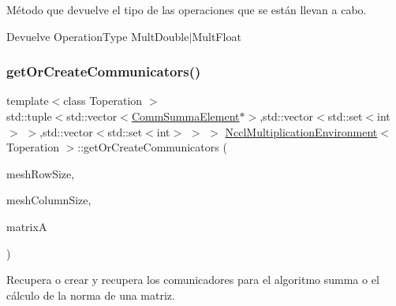 Método que devuelve el tipo de las operaciones que se están llevan a cabo. 

\begin{DoxyReturn}{Devuelve}
Operation\+Type Mult\+Double$\vert$\+Mult\+Float 
\end{DoxyReturn}
\mbox{\label{classNcclMultiplicationEnvironment_a416a457b998aa7304d80dfede63ccbad}} 
\subsubsection{\texorpdfstring{get\+Or\+Create\+Communicators()}{getOrCreateCommunicators()}}
{\footnotesize\ttfamily template$<$class Toperation $>$ \\
std\+::tuple$<$std\+::vector$<$\hyperlink{classCommSummaElement}{Comm\+Summa\+Element}$\ast$$>$,std\+::vector$<$std\+::set$<$int$>$ $>$,std\+::vector$<$std\+::set$<$int$>$ $>$ $>$ \hyperlink{classNcclMultiplicationEnvironment}{Nccl\+Multiplication\+Environment}$<$ Toperation $>$\+::get\+Or\+Create\+Communicators (\begin{DoxyParamCaption}\item[{int}]{mesh\+Row\+Size,  }\item[{int}]{mesh\+Column\+Size,  }\item[{\hyperlink{classMatrixMain}{Matrix\+Main}$<$ Toperation $>$ $\ast$}]{matrixA }\end{DoxyParamCaption})}



Recupera o crear y recupera los comunicadores para el algoritmo summa o el cálculo de la norma de una matriz. 


